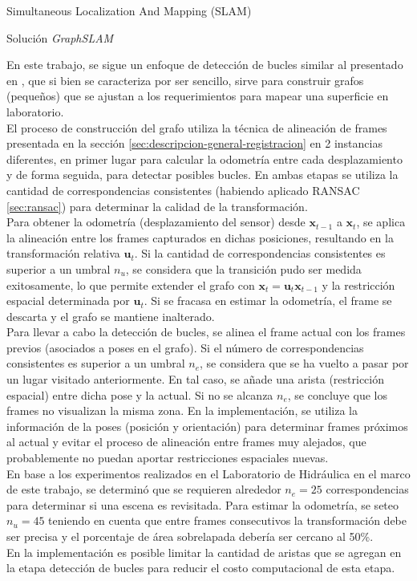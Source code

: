 \begin{subsection}{Simultaneous Localization And Mapping (SLAM) }
\begin{subsection}{Solución \textit{GraphSLAM}}
\begin{subsection}
En este trabajo, se sigue un enfoque de detección de bucles similar al presentado en \cite{henry2010rgb}, que si bien se caracteriza por ser sencillo, sirve para construir grafos (pequeños) que se ajustan a los requerimientos para mapear una superficie en laboratorio. \\
El proceso de construcción del grafo utiliza la técnica de alineación de frames presentada en la sección \ref{sec:descripcion-general-registracion} en 2 instancias diferentes, en primer lugar para calcular la odometría entre cada desplazamiento y de forma seguida, para detectar posibles bucles. En ambas etapas se utiliza la cantidad de correspondencias consistentes (habiendo aplicado RANSAC \ref{sec:ransac}) para determinar la calidad de la transformación. \\
Para obtener la odometría (desplazamiento del sensor) desde $\textbf{x}_{t-1}$ a $\textbf{x}_{t}$, se aplica la alineación entre los frames capturados en dichas posiciones, resultando en la transformación relativa $\textbf{u}_{t}$. Si la cantidad de correspondencias consistentes es superior a un umbral $n_{u}$, se considera que la transición pudo ser medida exitosamente, lo que permite extender el grafo con $\textbf{x}_{t} = \textbf{u}_{t} \textbf{x}_{t-1}$ y la restricción espacial determinada por $\textbf{u}_{t}$. Si se fracasa en estimar la odometría, el frame se descarta y el grafo se mantiene inalterado. \\
Para llevar a cabo la detección de bucles, se alinea el frame actual con los frames previos (asociados a poses en el grafo). Si el número de correspondencias consistentes es superior a un umbral $n_{e}$, se considera que se ha vuelto a pasar por un lugar visitado anteriormente. En tal caso, se añade una arista (restricción espacial) entre dicha pose y la actual. Si no se alcanza $n_{e}$, se concluye que los frames no visualizan la misma zona. En la implementación, se utiliza la información de la poses (posición y orientación) para determinar frames próximos al actual y evitar el proceso de alineación entre frames muy alejados, que probablemente no puedan aportar restricciones espaciales nuevas. \\
En base a los experimentos realizados en el Laboratorio de Hidráulica en el marco de este trabajo, se determinó que se requieren alrededor $n_{e} = 25$ correspondencias para determinar si una escena es revisitada. Para estimar la odometría, se seteo $n_{u} = 45$ teniendo en cuenta que entre frames consecutivos la transformación debe ser precisa y el porcentaje de área sobrelapada debería ser cercano al 50\%. \\
En la implementación es posible limitar la cantidad de aristas que se agregan en la etapa detección de bucles para reducir el costo computacional de esta etapa.
\end{subsection}


\end{subsection}
\end{subsection}
